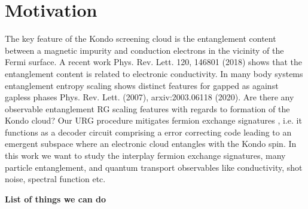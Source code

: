 \documentclass[aps,prl,preprint,groupedaddress]{revtex4-2}
\begin{document}
\section{Motivation}
The key feature of the Kondo screening cloud is the entanglement content between a magnetic impurity and conduction electrons in the vicinity of the Fermi surface. A recent work Phys. Rev. Lett. 120, 146801 (2018) shows that the entanglement content is related to electronic conductivity. In many body systems entanglement entropy scaling shows distinct features for gapped as against gapless phases Phys. Rev. Lett. (2007), arxiv:2003.06118 (2020).  Are there any observable entanglement RG scaling features with regards to formation of the Kondo cloud? Our  URG procedure mitigates fermion exchange signatures , i.e. it functions as a decoder circuit comprising a error correcting code leading to an emergent subspace where an electronic cloud entangles with the Kondo spin. In this work we want to study the interplay fermion exchange signatures, many particle entanglement, and quantum transport observables like conductivity, shot noise, spectral function etc.\\
\par\noindent
\textbf{List of things we can do}
\par\noindent
\end{document}
